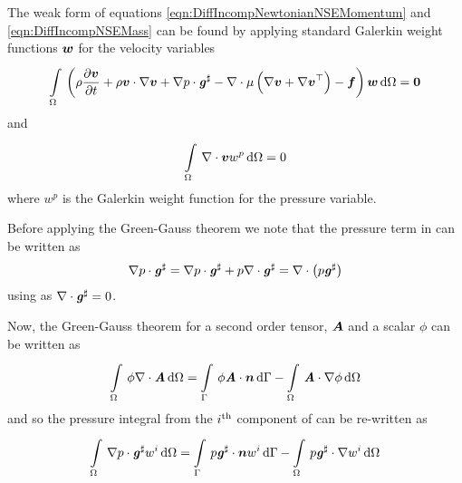 The weak form of equations \ref{eqn:DiffIncompNewtonianNSEMomentum} and
\ref{eqn:DiffIncompNSEMass} can be found by applying standard Galerkin weight
functions $ \boldsymbol{w} $ for the velocity variables \ie
\begin{equation}
  \gint{\Omega}{}{\pbrac{\rho\delby{\vectr{v}}{t}+\dotprod{\rho\vectr{v}}{\gradient{}{\vectr{v}}}
      +\dotprod{\gradient{}{p}}{\sharptensor{\tensor{g}}}
      -\divergence{}{\mu\pbrac{\gradient{}{\vectr{v}+\transpose{\gradient{}{\vectr{v}}}}}}
      -\vectr{f}}{\vectr{w}}}{\Omega} = \vectr{0}
 \label{eqn:BasicGalerkinNSEMomentum}
\end{equation}
and
\begin{equation}
  \gint{\Omega}{}{\divergence{}{\vectr{v}}w^{p}}{\Omega} = 0
 \label{eqn:BasicGalerkinNSEMass}
\end{equation}
where $w^{p}$ is the Galerkin weight function for the pressure variable.

Before applying the Green-Gauss theorem we note that the pressure term in
 can be written as
\begin{equation}
  \dotprod{\gradient{}{p}}{\sharptensor{\tensor{g}}}=\dotprod{\gradient{}{p}}{\sharptensor{\tensor{g}}}+p\divergence{}{\sharptensor{\tensor{g}}}=\divergence{}{\pbrac{p\sharptensor{\tensor{g}}}}
\end{equation}
using  as
$\divergence{}{\sharptensor{\tensor{g}}}=0$.

Now, the Green-Gauss theorem for a second order tensor, $ \boldsymbol{A} $ and a
scalar $\phi$ can be written as
\begin{equation}
  \gint{\Omega}{}{\phi\divergence{}{\tensor{A}}}{\Omega}=\gint{\Gamma}{}{\dotprod{\phi\tensor{A}}{\vectr{n}}}{\Gamma}-\gint{\Omega}{}{\dotprod{\tensor{A}}{\gradient{}{\phi}}}{\Omega}
\end{equation}
and so the pressure integral from the ${i}^{\text{th}}$ component of
 can be re-written as
\begin{equation}
  \gint{\Omega}{}{\dotprod{\gradient{}{p}}{\sharptensor{\tensor{g}}}w^{i}}{\Omega}=\gint{\Gamma}{}{\dotprod{p\sharptensor{\tensor{g}}}{\vectr{n}}w^{i}}{\Gamma}-\gint{\Omega}{}{\dotprod{p\sharptensor{\tensor{g}}}{\gradient{}{w^{i}}}}{\Omega}
\end{equation}

